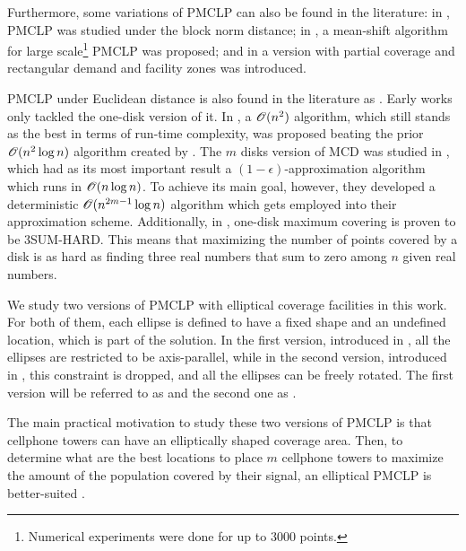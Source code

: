 Furthermore, some variations of PMCLP can also be found in the literature: in , PMCLP was studied under the block norm distance; in , a mean-shift algorithm for large scale\footnote{Numerical experiments were done for up to $3000$ points.} PMCLP was proposed; and in  a version with partial coverage and rectangular demand and facility zones was introduced.

PMCLP under Euclidean distance is also found in the literature as .
Early works only tackled the one-disk version of it. In , a $\mathscr{O}(n^2)$ algorithm, which still stands as the best in terms of run-time complexity, was proposed beating the prior $\mathscr{O}(n^2\log{n})$ algorithm created by .
The $m$ disks version of MCD was studied in , which had as its most important result a $(1-\epsilon)$-approximation algorithm which runs in $\mathscr{O}(n\log{n})$. To achieve its main goal, however, they developed a deterministic $\mathscr{O}(n^{2m-1}\log{n})$ algorithm which gets employed into their approximation scheme.
Additionally, in , one-disk maximum covering is proven to be 3SUM-HARD. This means that maximizing the number of points covered by a disk is as hard as finding three real numbers that sum to zero among $n$ given real numbers.

We study two versions of PMCLP with elliptical coverage facilities in this work. For both of them, each ellipse is defined to have a fixed shape and an undefined location, which is part of the solution.
In the first version, introduced in , all the ellipses are restricted to be axis-parallel, while in the second version, introduced in , this constraint is dropped, and all the ellipses can be freely rotated.
The first version will be referred to as  and the second one as  .

The main practical motivation to study these two versions of PMCLP is that cellphone towers can have an elliptically shaped coverage area. Then, to determine what are the best locations to place $m$ cellphone towers to maximize the amount of the population covered by their signal, an elliptical PMCLP is better-suited \cite{canbolat}.

